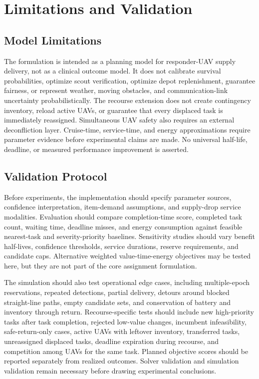 \documentclass[conference]{IEEEtran}
\begin{document}
\section{Limitations and Validation}
\subsection{Model Limitations}
The formulation is intended as a planning model for responder-UAV supply delivery, not as a clinical outcome model. It does not calibrate survival probabilities, optimize scout verification, optimize depot replenishment, guarantee fairness, or represent weather, moving obstacles, and communication-link uncertainty probabilistically. The recourse extension does not create contingency inventory, reload active UAVs, or guarantee that every displaced task is immediately reassigned. Simultaneous UAV safety also requires an external deconfliction layer. Cruise-time, service-time, and energy approximations require parameter evidence before experimental claims are made. No universal half-life, deadline, or measured performance improvement is asserted.

\subsection{Validation Protocol}
Before experiments, the implementation should specify parameter sources, confidence interpretation, item-demand assumptions, and supply-drop service modalities. Evaluation should compare completion-time score, completed task count, waiting time, deadline misses, and energy consumption against feasible nearest-task and severity-priority baselines. Sensitivity studies should vary benefit half-lives, confidence thresholds, service durations, reserve requirements, and candidate caps. Alternative weighted value-time-energy objectives may be tested here, but they are not part of the core assignment formulation.

The simulation should also test operational edge cases, including multiple-epoch reservations, repeated detections, partial delivery, detours around blocked straight-line paths, empty candidate sets, and conservation of battery and inventory through return. Recourse-specific tests should include new high-priority tasks after task completion, rejected low-value changes, incumbent infeasibility, safe-return-only cases, active UAVs with leftover inventory, transferred tasks, unreassigned displaced tasks, deadline expiration during recourse, and competition among UAVs for the same task. Planned objective scores should be reported separately from realized outcomes. Solver validation and simulation validation remain necessary before drawing experimental conclusions.
\end{document}
